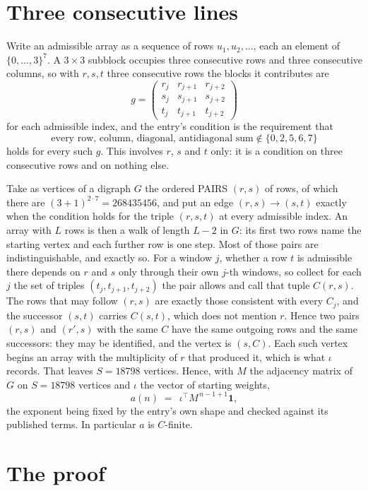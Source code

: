 \documentclass[11pt,a4paper]{article}
\theoremstyle{plain}
\theoremstyle{definition}
\begin{document}
\section{Three consecutive lines}

Write an admissible array as a sequence of rows $u_1,u_2,\dots$, each an element of
$\{0,\dots,3\}^{7}$. A $3\times3$ subblock occupies three consecutive rows and
three consecutive columns, so with $r,s,t$ three consecutive rows the blocks it
contributes are
\[
g=\begin{pmatrix}r_j&r_{j+1}&r_{j+2}\\ s_j&s_{j+1}&s_{j+2}\\ t_j&t_{j+1}&t_{j+2}\end{pmatrix}
\]
for each admissible index, and the entry's condition is the requirement that
\[
\text{every row, column, diagonal, antidiagonal sum} \notin \{0,2,5,6,7\}
\]
holds for every such $g$. This involves $r$, $s$ and $t$ only: it is a condition on
three consecutive rows and on nothing else.

Take as vertices of a digraph $G$ the ordered PAIRS $(r,s)$ of rows, of which there are
$(3+1)^{2\cdot7}=268435456$, and put an edge $(r,s)\to(s,t)$ exactly when the condition
holds for the triple $(r,s,t)$ at every admissible index. An array with $L$ rows is then a
walk of length $L-2$ in $G$: its first two rows name the starting vertex and each further
row is one step. Most of those pairs are indistinguishable, and exactly so. For a window $j$, whether a row $t$ is admissible there depends on $r$ and $s$ only through their own $j$-th windows, so collect for each $j$ the set of triples $(t_j,t_{j+1},t_{j+2})$ the pair allows and call that tuple $C(r,s)$. The rows that may follow $(r,s)$ are exactly those consistent with every $C_j$, and the successor $(s,t)$ carries $C(s,t)$, which does not mention $r$. Hence two pairs $(r,s)$ and $(r',s)$ with the same $C$ have the same outgoing rows and the same successors: they may be identified, and the vertex is $(s,C)$. Each such vertex begins an array with the multiplicity of $r$ that produced it, which is what $\iota$ records. That leaves $S=18798$ vertices. Hence, with $M$ the adjacency matrix of $G$ on $S=18798$ vertices and
$\iota$ the vector of starting weights,
\[
a(n)\;=\;\,\iota^{\!\top}M^{\,n-1+1}\mathbf{1},
\]
the exponent being fixed by the entry's own shape and checked against its published terms.
In particular $a$ is $C$-finite.

\section{The proof}
\end{document}
